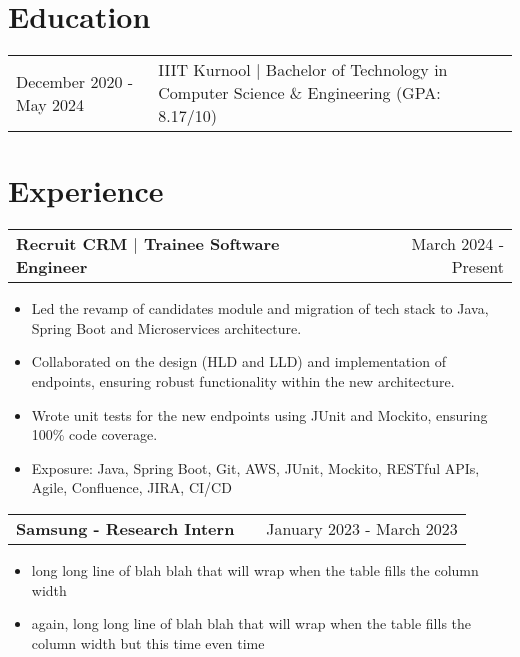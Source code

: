 \documentclass[a4paper,10pt]{article}
\makeatletter
\newenvironment{joblong}[2]
    {
    \begin{tabularx}{\linewidth}{@{}l X r@{}}
    \textbf{#1} & \hfill &  #2 \\[3.75pt]
    \end{tabularx}
    \begin{minipage}[t]{\linewidth}
    \begin{itemize}[nosep,after=\strut, leftmargin=1em, itemsep=2pt,label=--]
    }
    {
    \end{itemize}
    \end{minipage}    
    }
\makeatother
\begin{document}



\section{Education}
\vspace{-5pt}
\begin{tabularx}{\linewidth}{@{}l X@{}}	
December 2020 - May 2024 & IIIT Kurnool $|$ Bachelor of Technology in Computer Science \& Engineering \hfill \normalsize (GPA: 8.17/10) \\
\end{tabularx}


\section{Experience}
\vspace{-5pt}
\begin{joblong}{Recruit CRM $|$ Trainee Software Engineer}{March 2024 - Present}
\item Led the revamp of candidates module and migration of tech stack to Java, Spring Boot and Microservices architecture.
\item Collaborated on the design (HLD and LLD) and implementation of endpoints, ensuring robust functionality within the
new architecture.
\item Wrote unit tests for the new endpoints using JUnit and Mockito, ensuring 100\% code coverage.
\item Exposure: Java, Spring Boot, Git, AWS, JUnit, Mockito, RESTful APIs, Agile, Confluence, JIRA, CI/CD
\end{joblong}

\begin{joblong}{Samsung - Research Intern}{January 2023 - March 2023}
\item long long line of blah blah that will wrap when the table fills the column width
\item again, long long line of blah blah that will wrap when the table fills the column width but this time even time 
\end{joblong}
\end{document}
